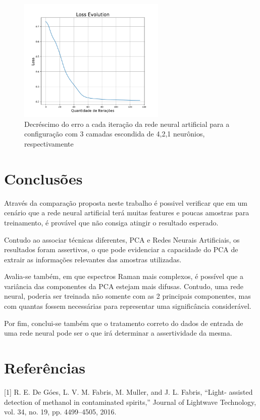 \documentclass{article}
\begin{document}
\begin{figure}[ht]
\centering
\includegraphics[width=7cm]{rna_pca_4_2_1_loss}
\caption{Decréscimo do erro a cada iteração da rede neural artificial para a configuração com 3 camadas escondida de 4,2,1 neurônios, respectivamente}
\label{rna_pca_4_2_1_loss}
\end{figure}

\vspace{4cm}
\section{Conclusões}
\vspace{1cm} Através da comparação proposta neste trabalho é possivel verificar que em um cenário que a rede neural artificial terá muitas features e poucas amostras para treinamento, é provável que não consiga atingir o resultado esperado.

Contudo ao associar técnicas diferentes, PCA e Redes Neurais Artificiais, os resultados foram assertivos, o que pode evidenciar a capacidade do PCA de extrair as informações relevantes das amostras utilizadas.

Avalia-se também, em que espectros Raman mais complexos, é possível que a variância das componentes da PCA estejam mais difusas. Contudo, uma rede neural, poderia ser treinada não somente com as 2 principais componentes, mas com quantas fossem necessárias para representar uma significância considerável.

Por fim, conclui-se também que o tratamento correto do dados de entrada de uma rede neural pode ser o que irá determinar a assertividade da mesma.
\vspace{2cm}
\section*{Referências}
\vspace{1cm} [1] R. E. De Góes, L. V. M. Fabris, M. Muller, and J. L. Fabris, “Light-
assisted detection of methanol in contaminated spirits,” Journal of
Lightwave Technology, vol. 34, no. 19, pp. 4499–4505, 2016.
\end{document}
